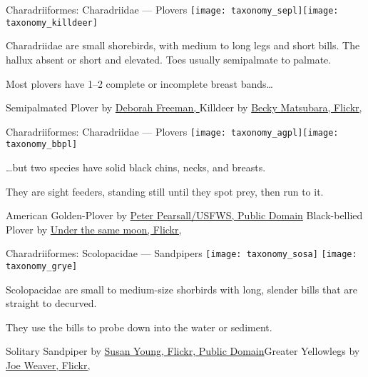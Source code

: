 \documentclass[t]{beamer}
\begin{document}
\begin{frame}{Charadriiformes: Charadriidae — Plovers}
\texttt{[image: taxonomy\_sepl]}\hfill \texttt{[image: taxonomy\_killdeer]}

Charadriidae are small shorebirds, with medium to long legs and short bills. The hallux absent or short and elevated. Toes usually semipalmate to palmate.

\vspace{\baselineskip}

Most plovers have 1–2 complete or incomplete breast bands\dots


\vfilll

\tiny Semipalmated Plover by  \href{https://flickr.com/photos/island_deborah/51161493609}{Deborah Freeman, } \hfill Killdeer by \href{https://flickr.com/photos/beckymatsubara/46556538305}{Becky Matsubara, Flickr, }
\end{frame}
%
\begin{frame}{Charadriiformes: Charadriidae — Plovers}
\texttt{[image: taxonomy\_agpl]}\hfill \texttt{[image: taxonomy\_bbpl]}

\dots but two species have solid black chins, necks, and breasts.

\vspace{\baselineskip}

They are sight feeders, standing still until they spot prey, then run to it. 


\vfilll

\tiny American Golden-Plover by  \href{https://flickr.com/photos/usfws_alaska/51101401474}{Peter Pearsall/USFWS, Public Domain} \hfill Black-bellied Plover by \href{https://flickr.com/photos/71119007@N03/17440547326}{Under the same moon, Flickr, }
\end{frame}



\begin{frame}{Charadriiformes: Scolopacidae — Sandpipers}
\texttt{[image: taxonomy\_sosa]} \hfill \texttt{[image: taxonomy\_grye]}

Scolopacidae are small to medium-size shorbirds with long, slender bills that are straight to decurved. 

\vspace{\baselineskip}

They use the bills to probe down into the water or sediment. 


\vfilll

\tiny Solitary Sandpiper by \href{https://flickr.com/photos/95782365@N08/52243404588}{Susan Young, Flickr, Public Domain}\hfill Greater Yellowlegs by  \href{https://flickr.com/photos/joeweav/30133422748}{Joe Weaver, Flickr, }

\end{frame}
\end{document}
